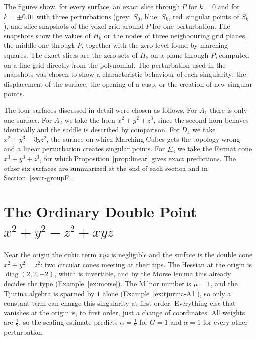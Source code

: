 \documentclass[12pt, a4paper, oneside]{book}
\theoremstyle{plain}
\theoremstyle{definition}
\theoremstyle{remark}
\theoremstyle{definition}
\begin{document}
The figures show, for every surface, an exact slice through $P$ for $k=0$ and for $k=\pm0.01$ with three perturbations (grey: $S_0$, blue: $S_k$, red: singular points of $S_k$), and slice snapshots of the voxel grid around $P$ for one perturbation. The snapshots show the values of $H_k$ on the nodes of three neighbouring grid planes, the middle one through $P$, together with the zero level found by marching squares. The exact slices are the zero sets of $H_k$ on a plane through $P$, computed on a fine grid directly from the polynomial. The perturbation used in the snapshots was chosen to show a characteristic behaviour of each singularity: the displacement of the surface, the opening of a cusp, or the creation of new singular points.

The four surfaces discussed in detail were chosen as follows. For $A_1$ there is only one surface. For $A_2$ we take the horn $x^2+y^2+z^3$, since the second horn behaves identically and the saddle is described by comparison. For $D_4$ we take $x^2+y^3-3yz^2$, the surface on which Marching Cubes gets the topology wrong and a linear perturbation creates singular points. For $\tilde E_6$ we take the Fermat cone $x^3+y^3+z^3$, for which Proposition~\ref{prop:linear} gives exact predictions. The other six surfaces are summarized at the end of each section and in Section~\ref{sec:r-groupF}.

\section{The Ordinary Double Point $x^2+y^2-z^2+xyz$}
\label{sec:r-A1}

Near the origin the cubic term $xyz$ is negligible and the surface is the double cone $x^2+y^2=z^2$: two circular cones meeting at their tips. The Hessian at the origin is $\operatorname{diag}(2,2,-2)$, which is invertible, and by the Morse lemma this already decides the type (Example~\ref{ex:morse}). The Milnor number is $\mu=1$, and the Tjurina algebra is spanned by $1$ alone (Example~\ref{ex:tjurina-A1}), so only a constant term can change this singularity at first order. Everything else that vanishes at the origin is, to first order, just a change of coordinates. All weights are $\tfrac12$, so the scaling estimate predicts $\alpha=\tfrac12$ for $G=1$ and $\alpha=1$ for every other perturbation.
\end{document}
